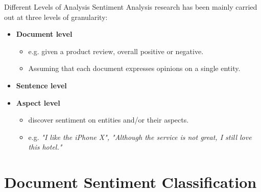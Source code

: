 \documentclass[xcolor=table]{beamer}
\begin{document}
\begin{frame}{Different Levels of Analysis}
    Sentiment Analysis research has been mainly carried out at three levels of granularity:
    \begin{itemize}
        \item \textbf{Document level}
            \begin{itemize}
                \item e.g. given a product review, overall positive or negative.
                \item Assuming that each document expresses opinions on a single entity.
            \end{itemize}
        
        \item \textbf{Sentence level}
        \item \textbf{Aspect level}
            \begin{itemize}
                \item discover sentiment on entities and/or their aspects.
                \item e.g. \textit{"I like the iPhone X", "Although the service is not great, I still love this hotel."}
            \end{itemize}
    \end{itemize}
\end{frame}


\section{Document Sentiment Classification}
\end{document}
